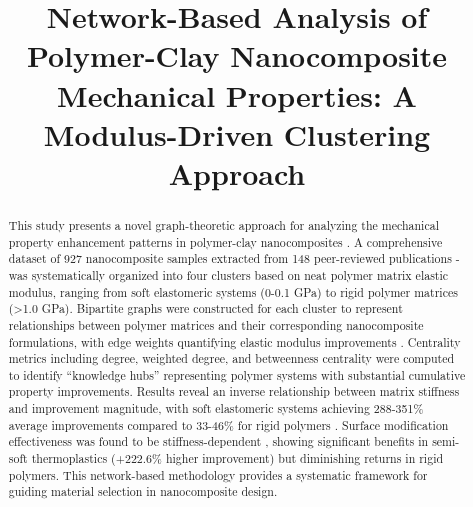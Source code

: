 \documentclass[conference]{IEEEtran}
\begin{document}
\title{Network-Based Analysis of Polymer-Clay Nanocomposite Mechanical Properties: A Modulus-Driven Clustering Approach}

\author{
\and
{}
\and
{}
\and
{}

}

\maketitle

\begin{abstract}
This study presents a novel graph-theoretic approach for analyzing the mechanical property enhancement patterns in polymer-clay nanocomposites \cite{112, 127}. A comprehensive dataset of 927 nanocomposite samples extracted from 148 peer-reviewed publications \cite{1}-\cite{148} was systematically organized into four clusters based on neat polymer matrix elastic modulus, ranging from soft elastomeric systems (0-0.1 GPa) to rigid polymer matrices (>1.0 GPa). Bipartite graphs were constructed for each cluster to represent relationships between polymer matrices and their corresponding nanocomposite formulations, with edge weights quantifying elastic modulus improvements \cite{10, 11}. Centrality metrics including degree, weighted degree, and betweenness centrality were computed to identify ``knowledge hubs'' representing polymer systems with substantial cumulative property improvements. Results reveal an inverse relationship between matrix stiffness and improvement magnitude, with soft elastomeric systems achieving 288-351\% average improvements compared to 33-46\% for rigid polymers \cite{14, 22}. Surface modification effectiveness was found to be stiffness-dependent \cite{138, 107}, showing significant benefits in semi-soft thermoplastics (+222.6\% higher improvement) but diminishing returns in rigid polymers. This network-based methodology provides a systematic framework for guiding material selection in nanocomposite design.
\end{abstract}
\end{document}
